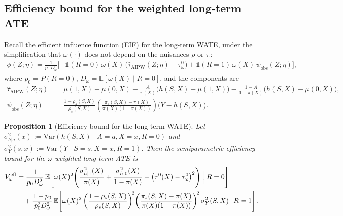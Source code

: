 \documentclass{article}
\theoremstyle{plain}
\newtheorem{proposition}[theorem]{Proposition}
\theoremstyle{definition}
\theoremstyle{remark}
\newcommand{\1}{\mathds{1}}                %
\begin{document}
\subsection{Efficiency bound for the weighted long-term ATE}
\label{sec:efficiency_bound}

Recall the efficient influence function (EIF) for the long-term WATE, under the
simplification that $\omega(\cdot)$ does not depend on the nuisances $\rho$ or $\pi$:
\begin{align}
\phi(Z; \eta) = \frac{1}{p_0\, D_\omega} \Bigg[
&\mathbb{1}(R=0)\,\omega(X)\,\big(\hat{\tau}_{\text{AIPW}}(Z;\eta) - \tau^0_\omega\big)
+ \mathbb{1}(R=1)\,\omega(X)\,\psi_{\text{obs}}(Z;\eta) \Bigg],
\label{eq:eif_simplified}
\end{align}
where $p_0 = P(R=0)$, $D_\omega = \mathbb{E}[\omega(X) \mid R=0]$, and the components are
\begin{align}
\hat{\tau}_{\text{AIPW}}(Z;\eta)
&= \mu(1,X) - \mu(0,X)
+ \frac{A}{\pi(X)}\big(h(S,X) - \mu(1,X)\big)
- \frac{1-A}{1-\pi(X)}\big(h(S,X) - \mu(0,X)\big), \\
\psi_{\text{obs}}(Z;\eta)
&= \frac{1-\rho_s(S,X)}{\rho_s(S,X)}
\left(\frac{\pi_s(S,X) - \pi(X)}{\pi(X)(1-\pi(X))}\right)
\big(Y - h(S,X)\big).
\end{align}

\begin{proposition}[Efficiency bound for the long-term WATE]
\label{prop:eif_variance}
Let $\sigma^2_{h|a}(x) := \mathrm{Var}(h(S,X) \mid A=a, X=x, R=0)$ and
$\sigma^2_Y(s,x) := \mathrm{Var}(Y \mid S=s, X=x, R=1)$. Then the semiparametric
efficiency bound for the $\omega$-weighted long-term ATE is
\begin{align}
V^{\text{eff}}_\omega
&= \frac{1}{p_0 D_\omega^2}\,\mathbb{E}\!\left[\omega(X)^2\!\left(
\frac{\sigma^2_{h|1}(X)}{\pi(X)} + \frac{\sigma^2_{h|0}(X)}{1-\pi(X)}
+ \big(\tau^0(X) - \tau^0_\omega\big)^2
\right)\,\Big|\,R=0\right] \notag\\
&\quad + \frac{1-p_0}{p_0^2 D_\omega^2}\,\mathbb{E}\!\left[\omega(X)^2
\left(\frac{1-\rho_s(S,X)}{\rho_s(S,X)}\right)^{\!2}
\!\left(\frac{\pi_s(S,X)-\pi(X)}{\pi(X)(1-\pi(X))}\right)^{\!2}
\sigma^2_Y(S,X)\,\Big|\,R=1\right].
\label{eq:efficiency_bound}
\end{align}
\end{proposition}
\end{document}
